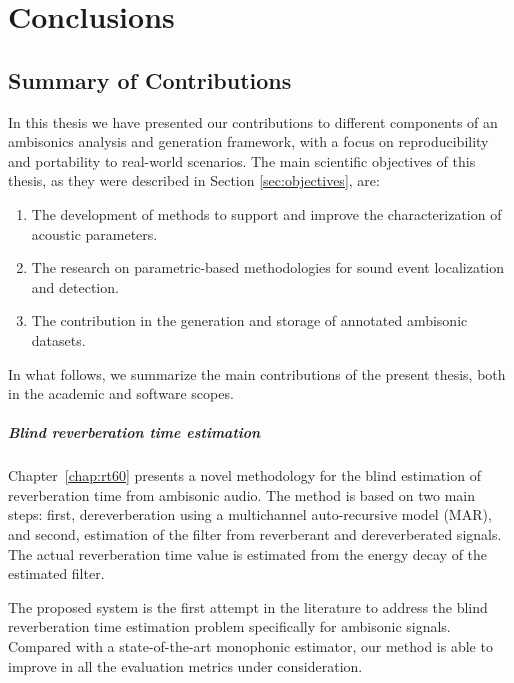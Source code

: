 \chapter{Conclusions}


\section{Summary of Contributions}

In this thesis we have presented our contributions to different components of an ambisonics analysis and generation framework, with a focus on reproducibility and portability to real-world scenarios.
The main scientific objectives of this thesis, as they were described in Section \ref{sec:objectives}, are: 
 

\begin{enumerate}
	\item The development of methods to support and improve the characterization of acoustic parameters.
	\item The research on parametric-based methodologies for sound event localization and detection.
	\item The contribution in the generation and storage of annotated ambisonic datasets.
\end{enumerate}

In what follows, we summarize the main contributions of the present thesis, both in the academic and software scopes.


\newpage
\paragraph{Blind reverberation time estimation}
Chapter~\ref{chap:rt60} presents a novel methodology for the blind estimation of reverberation time from ambisonic audio. The method is based on two main steps: first, dereverberation using a multichannel auto-recursive model (MAR), and second, estimation of the  filter from reverberant and dereverberated signals. The actual reverberation time value is estimated from the energy decay of the estimated filter. 

The proposed system is the first attempt in the literature to address the blind reverberation time estimation problem specifically for ambisonic signals. Compared with a state-of-the-art monophonic estimator, our method is able to improve in all the evaluation metrics under consideration.



